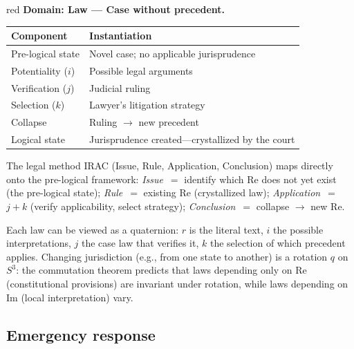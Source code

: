 \documentclass[11pt,a4paper]{article}
\begin{document}
\begin{domainbox}{red}
\textbf{Domain: Law --- Case without precedent.}

\begin{tabularx}{\textwidth}{l Y}
\toprule
\textbf{Component} & \textbf{Instantiation} \\
\midrule
Pre-logical state & Novel case; no applicable jurisprudence \\
Potentiality ($i$) & Possible legal arguments \\
Verification ($j$) & Judicial ruling \\
Selection ($k$) & Lawyer's litigation strategy \\
Collapse & Ruling $\to$ new precedent \\
Logical state & Jurisprudence created---crystallized by the court \\
\bottomrule
\end{tabularx}

The legal method IRAC (Issue, Rule, Application, Conclusion) maps
directly onto the pre-logical framework:
\emph{Issue}~$=$ identify which Re does not yet exist (the pre-logical state);
\emph{Rule}~$=$ existing Re (crystallized law);
\emph{Application}~$=$ $j + k$ (verify applicability, select strategy);
\emph{Conclusion}~$=$ collapse $\to$ new Re.

Each law can be viewed as a quaternion: $r$ is the literal text, $i$ the
possible interpretations, $j$ the case law that verifies it, $k$ the
selection of which precedent applies. Changing jurisdiction (e.g.,
from one state to another) is a rotation $q$ on $S^3$: the commutation
theorem predicts that laws depending only on Re (constitutional
provisions) are invariant under rotation, while laws depending on Im
(local interpretation) vary.
\end{domainbox}

\subsection{Emergency response}
\end{document}
